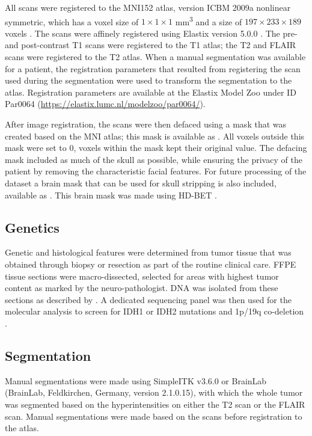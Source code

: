 All scans were registered to the MNI152 atlas, version ICBM 2009a nonlinear symmetric, which has a voxel size of $1 \times 1 \times 1$ \si{\cubic\milli\metre} and a size of $197 \times 233 \times 189$ voxels \autocite{fonov2009unbiased,fonov2011unbiased}.
The scans were affinely registered using Elastix version 5.0.0 \autocite{shamonin2014fast,klein2010elastix}.
The pre- and post-contrast \gls{T1} scans were registered to the \gls{T1} atlas; the \gls{T2} and \gls{FLAIR} scans were registered to the \gls{T2} atlas.
When a manual segmentation was available for a patient, the registration parameters that resulted from registering the scan used during the segmentation were used to transform the segmentation to the atlas.
Registration parameters are available at the Elastix Model Zoo  under ID Par0064 (\url{https://elastix.lumc.nl/modelzoo/par0064/}).

After image registration, the scans were then defaced using a mask that was created based on the MNI atlas; this mask is available as .
All voxels outside this mask were set to 0, voxels within the mask kept their original value.
The defacing mask included as much of the skull as possible, while ensuring the privacy of the patient by removing the characteristic facial features.
For future processing of the dataset a brain mask that can be used for skull stripping is also included, available as .
This brain mask was made using HD-BET \autocite{isensee2019hdbet}.

\subsection{Genetics}

Genetic and histological features were determined from \gls{tumor} tissue that was obtained through biopsy or resection as part of the routine clinical care.
\Gls{FFPE} tissue sections were macro-dissected, selected for areas with highest \gls{tumor} content as marked by the neuro-pathologist.
DNA was isolated from these sections as described by .
A dedicated sequencing panel was then used for the molecular analysis to screen for \gls{IDH}1 or \gls{IDH}2 mutations and 1p/19q co-deletion \autocite{dubbink2015molecular}.

\subsection{Segmentation}
Manual segmentations were made using SimpleITK v3.6.0 \autocite{yushkevich2006user} or BrainLab (BrainLab, Feldkirchen, Germany, version 2.1.0.15), with which the whole \gls{tumor} was segmented based on the hyperintensities on either the \gls{T2} scan or the \gls{FLAIR} scan.
Manual segmentations were made based on the scans before registration to the atlas.

